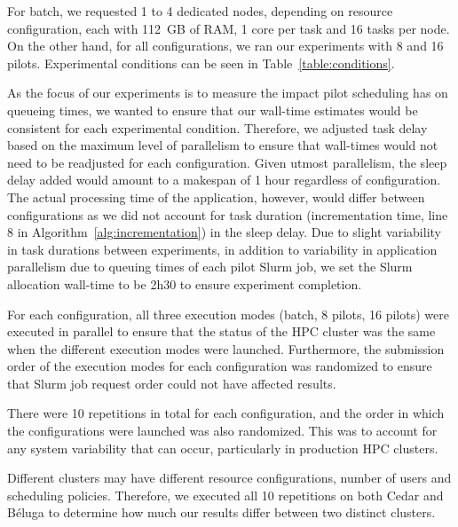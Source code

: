 \documentclass{IEEEtran}
\begin{document}
       For batch, we requested 1 to 4 dedicated nodes, depending on resource 
       configuration, each with 112~GB of RAM, 1 core per task and 16 tasks per 
       node. On the other hand, for all configurations, we ran our experiments
       with 8 and 16 pilots. Experimental conditions can be seen in Table~\ref{table:conditions}.

       As the focus of our experiments is to measure the impact pilot scheduling
       has on queueing times, we wanted to ensure that our wall-time estimates would
       be consistent for each experimental condition. Therefore, we adjusted task 
       delay based on the maximum level of parallelism to ensure that wall-times would
       not need to be readjusted for each configuration. Given utmost parallelism,
       the sleep delay added would amount to a makespan of 1 hour regardless
       of configuration. The actual processing time of the application, however, 
       would differ between configurations as we did not account for task duration (incrementation time, line
       8 in Algorithm~\ref{alg:incrementation})
       in the sleep delay. Due to slight variability in task durations between experiments, in 
       addition to variability in application parallelism due to queuing times of each pilot Slurm job, 
       we set the Slurm allocation wall-time to be 2h30 to ensure experiment completion.

       For each configuration, all three execution modes (batch, 8 pilots,
       16 pilots) were executed in parallel to ensure that the status of
       the HPC cluster was the same when the different execution modes
       were launched. Furthermore, the submission order of the execution
       modes for each configuration was randomized to ensure that Slurm job
       request order could not have affected results. 

       There were 10 repetitions in total for each configuration, and the order
       in which the configurations were launched was also randomized. This was to 
       account for any system variability that can occur, particularly in production
       HPC clusters. 

       Different clusters may have different resource configurations, number of 
       users and scheduling policies. Therefore, we executed all 10 repetitions on
       both Cedar and B\'eluga to determine how much our results differ between
       two distinct clusters.

\end{document}
